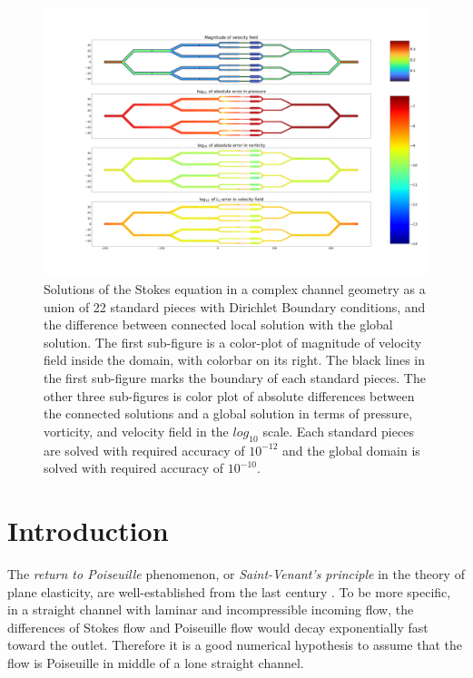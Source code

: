 \documentclass[10pt,twocolumn]{article}
\begin{document}
\begin{figure}[t] 
  \centering
  \includegraphics[width=\textwidth]{pic/connection-error-rough.png}
  \caption{Solutions of the Stokes equation in a complex channel geometry as a union of 22 standard pieces
    with Dirichlet Boundary conditions, 
    and the difference between connected local solution with the global solution. 
    The first sub-figure is a color-plot of magnitude of velocity field inside the 
    domain, with colorbar on its right. The black lines in the 
    first sub-figure marks the boundary of each standard pieces. 
    The other three sub-figures is color plot of absolute differences 
    between the connected solutions and a global solution in terms of pressure, 
    vorticity, and velocity field in the $log_{10}$ scale. Each standard pieces are solved
    with required accuracy of $10^{-12}$ and the global domain is solved with 
    required accuracy of $10^{-10}$.}
  \label{fig:connection-error}

\end{figure}

\section{Introduction}


The \textit{return to Poiseuille} phenomenon, or \textit{Saint-Venant's principle} in the theory of plane elasticity, 
are well-established from the last century 
\cite{coRecentDevelopmentsConcerning1983,gregoryTractionBoundaryValue1980,horganDECAYESTIMATESBIHARMONIC1989}. 
To be more specific, in a straight channel with laminar and incompressible incoming flow, the differences of Stokes flow and Poiseuille flow would decay exponentially fast toward the outlet. 
Therefore it is a good numerical hypothesis to assume that the flow is Poiseuille in middle of a lone straight channel.
\end{document}
